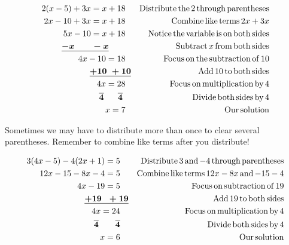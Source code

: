 \begin{example}\label{Lin24}
  \begin{eqnarray*}
    2 (x - 5) + 3 x = x + 18~~ &  & \operatorname{Distribute} \operatorname{the} 2
    \operatorname{through} \operatorname{parentheses}\\
    2 x - 10 + 3 x = x + 18~~ &  & \operatorname{Combine} \operatorname{like} \operatorname{terms} 2 x +
    3 x\\
    5 x - 10 = x + 18~~ &  & \operatorname{Notice} \operatorname{the} \operatorname{variable} \operatorname{is}
    \operatorname{on} \operatorname{both} \operatorname{sides}\\
    \boldsymbol{\underline{- x ~~~~~~- x}}~~~~~~~~  &  & \operatorname{Subtract} x \operatorname{from}
    \operatorname{both} \operatorname{sides}\\
    4 x - 10 = 18~~ &  & \operatorname{Focus} \operatorname{on} \operatorname{the} \operatorname{subtraction}
    \operatorname{of} 10\\
    \boldsymbol{\underline{+ 10 ~+10}}  &  & \operatorname{Add} 10 \operatorname{to} \operatorname{both}
    \operatorname{sides}\\
    4 x = 28~~ &  & \operatorname{Focus} \operatorname{on} \operatorname{multiplication} \operatorname{by} 4\\
    \boldsymbol{ \overline{4} ~~~~~ \overline{4}}~~~  &  & \operatorname{Divide} \operatorname{both}
    \operatorname{sides} \operatorname{by} 4\\
    x = 7~~ &  & \operatorname{Our} \operatorname{solution}
  \end{eqnarray*}
\end{example}

 Sometimes we may have to distribute more than once to clear several
parentheses. Remember to combine like terms after you distribute!

\begin{example}\label{Lin25}
  
  \begin{eqnarray*}
    3 (4 x - 5) - 4 (2 x + 1) = 5~~~ &  & \operatorname{Distribute} 3 \operatorname{and} - 4
    \operatorname{through} \operatorname{parentheses}\\
    12 x - 15 - 8 x - 4 = 5~~~ &  & \operatorname{Combine} \operatorname{like} \operatorname{terms} 12 x
    - 8 x \operatorname{and} - 15 - 4\\
    4 x - 19 = 5~~~ &  & \operatorname{Focus} \operatorname{on} \operatorname{subtraction} \operatorname{of} 19\\
    \underline{\boldsymbol{+ 19 ~~+ 19}} &  & \operatorname{Add} 19 \operatorname{to} \operatorname{both}
    \operatorname{sides}\\
    4 x = 24~~~ &  & \operatorname{Focus} \operatorname{on} \operatorname{multiplication} \operatorname{by} 4\\
    \boldsymbol{\overline{4} ~~~~~~ \overline{4}}~~~ &  & \operatorname{Divide} \operatorname{both}
    \operatorname{sides} \operatorname{by} 4\\
    x = 6~~~ &  & \operatorname{Our} \operatorname{solution}
  \end{eqnarray*}
\end{example}

